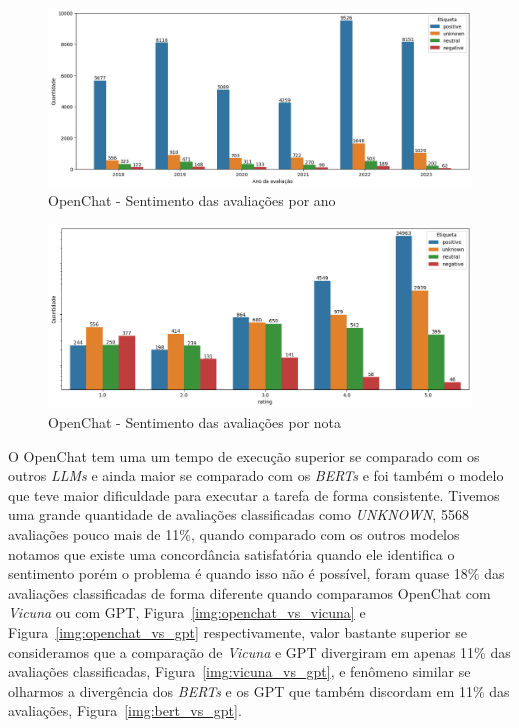 \begin{figure}
	\centering
	\includegraphics[width=1\textwidth]{figs/openchat/sentimento_ano.png}
	\caption{OpenChat - Sentimento das avaliações por ano}
	\label{img:openchat_sentimento_ano}
\end{figure}

\begin{figure}
	\centering
	\includegraphics[width=1\textwidth]{figs/openchat/sentimento_nota.png}
	\caption{OpenChat - Sentimento das avaliações por nota}
	\label{img:openchat_sentimento_nota}
\end{figure}

O OpenChat tem uma um tempo de execução superior se comparado com os outros \textit{LLMs} e ainda maior se comparado com os \textit{BERTs} e foi também o modelo que teve maior dificuldade para executar a tarefa de forma consistente. Tivemos uma grande quantidade de avaliações classificadas como \textit{UNKNOWN}, 5568 avaliações pouco mais de 11\%, quando comparado com os outros modelos notamos que existe uma concordância satisfatória quando ele identifica o sentimento porém o problema é quando isso não é possível, foram quase 18\% das avaliações classificadas de forma diferente quando comparamos OpenChat com \textit{Vicuna} ou com GPT, Figura~\ref{img:openchat_vs_vicuna} e Figura~\ref{img:openchat_vs_gpt} respectivamente, valor bastante superior se consideramos que a comparação de \textit{Vicuna} e GPT divergiram em apenas 11\% das avaliações classificadas, Figura~\ref{img:vicuna_vs_gpt}, e fenômeno similar se olharmos a divergência dos \textit{BERTs} e os GPT que também discordam em 11\% das avaliações, Figura~\ref{img:bert_vs_gpt}.


